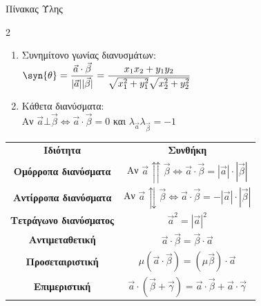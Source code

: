 \documentclass[twoside,nofonts,internet,math,spyros]{frontisthrio}
\begin{document}
\begin{mybox}[mysubtitle]{Πίνακας Ύλης}
\begin{multicols}{2}
\begin{enumerate}[itemsep=0mm,leftmargin=5mm]
\item Συνημίτονο γωνίας διανυσμάτων:\\$ \syn{\theta}=\dfrac{\vec{a}\cdot\vec{\beta}}{|\vec{a}||\vec{\beta}|}=\dfrac{x_1x_2+y_1y_2}{\sqrt{x_1^2+y_1^2}\sqrt{x_2^2+y_2^2}} $
\item Κάθετα διανύσματα:\\Αν $ \vec{a}\bot\vec{\beta}\Leftrightarrow \vec{a}\cdot\vec{\beta}=0 $ και $ \lambda_{\vec{a}}\lambda_{\vec{\beta}}=-1 $
\end{enumerate}
\end{multicols}
\begin{center}
\begin{longtable}{cc}
\hline \rule[-2ex]{0pt}{5ex} \textbf{Ιδιότητα} & \textbf{Συνθήκη} \\ 
\hhline{==}  \rule[-2ex]{0pt}{5ex} \textbf{Ομόρροπα διανύσματα} & Αν $ \vec{a}\upuparrows\vec{\beta}\Leftrightarrow \vec{a}\cdot\vec{\beta}=|\vec{a}|\cdot|\vec{\beta}| $ \\ 
\rule[-2ex]{0pt}{5ex} \textbf{Αντίρροπα διανύσματα} & Αν $ \vec{a}\updownarrows\vec{\beta}\Leftrightarrow \vec{a}\cdot\vec{\beta}=-|\vec{a}|\cdot|\vec{\beta}| $ \\ 
\rule[-2ex]{0pt}{5ex} \textbf{Τετράγωνο διανύσματος} & $ \vec{a}^2=|\vec{a}|^2 $ \\ 
\rule[-2ex]{0pt}{5ex} \textbf{Αντιμεταθετική} & $ \vec{a}\cdot\vec{\beta}=\vec{\beta}\cdot\vec{a} $ \\
\rule[-2ex]{0pt}{5ex} \textbf{Προσεταιριστική} & $ \mu(\vec{a}\cdot\vec{\beta})=(\mu\vec{\beta})\cdot\vec{a} $ \\
\rule[-2ex]{0pt}{5ex} \textbf{Επιμεριστική} & $ \vec{a}\cdot\left( \vec{\beta}+\vec{\gamma}\right) =\vec{a}\cdot\vec{\beta}+\vec{a}\cdot\vec{\gamma} $ \\
\hline 
\end{longtable}
\end{center} 
\end{mybox}
\newpage
\end{document}
